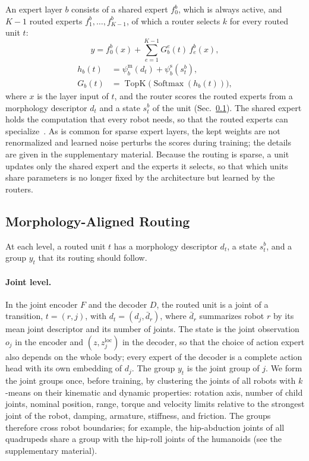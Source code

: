 An expert layer $b$ consists of a shared expert $f^b_0$, which is always active, and $K-1$ routed experts
$f^b_1,\dots,f^b_{K-1}$, of which a router selects $k$ for every routed unit $t$:
\begin{equation}
y=f^b_0(x)+\sum_{e=1}^{K-1}G^e_b(t)\,f^b_e(x),
\label{eq:expert_layer}
\end{equation}
\begin{equation}
\begin{aligned}
h_b(t)&=\psi^{\mathrm{m}}_b(d_t)+\psi^{\mathrm{s}}_b(s^b_t),\\
G_b(t)&=\operatorname{TopK}\bigl(\operatorname{Softmax}(h_b(t))\bigr),
\end{aligned}
\label{eq:router}
\end{equation}
where $x$ is the layer input of $t$, and the router scores the routed experts from a morphology descriptor $d_t$ and a
state $s^b_t$ of the unit (Sec.~\ref{sec:routing}). The shared expert holds the computation that every robot needs, so
that the routed experts can specialize~\citep{dai2024deepseekmoe}. As is common for sparse expert layers, the kept weights are not renormalized
and learned noise perturbs the scores during training; the details are given in the supplementary material. Because
the routing is sparse, a unit updates only the shared expert and the experts it selects, so that which units share
parameters is no longer fixed by the architecture but learned by the routers.

\subsection{Morphology-Aligned Routing}
\label{sec:routing}

At each level, a routed unit $t$ has a morphology descriptor $d_t$, a state $s^b_t$, and a group $y_t$ that its
routing should follow.

\paragraph{Joint level.}
In the joint encoder $F$ and the decoder $D$, the routed unit is a joint of a transition, $t=(r,j)$, with $d_t=(d_j,\bar d_r)$, where $\bar d_r$
summarizes robot $r$ by its mean joint descriptor and its number of joints. The state is the joint
observation $o_j$ in the encoder and $(z,z^{\mathrm{loc}}_j)$ in the decoder, so that the choice of action expert also
depends on the whole body; every expert of the decoder is a complete action head with its own embedding of $d_j$. The group $y_t$ is the
joint group of $j$. We form the joint groups once, before training, by clustering the joints of all robots with
$k$-means on their kinematic and dynamic properties: rotation axis, number of child joints, nominal position, range,
torque and velocity limits relative to the strongest joint of the robot, damping, armature, stiffness, and friction. The groups therefore cross robot boundaries; for example,
the hip-abduction joints of all quadrupeds share a group with the hip-roll joints of the humanoids (see the
supplementary material).

